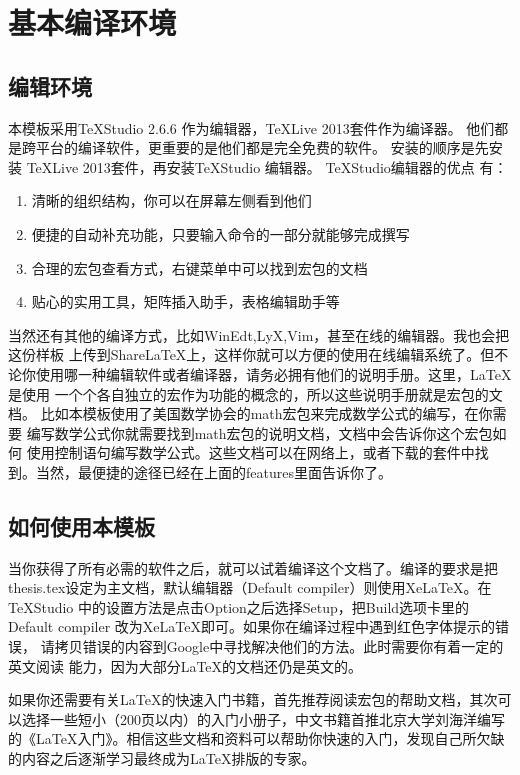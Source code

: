 \section{基本编译环境}
\subsection{编辑环境}

本模板采用\TeX Studio 2.6.6 作为编辑器，\TeX Live 2013套件作为编译器。
他们都是跨平台的编译软件，更重要的是他们都是完全免费的软件。 安装的顺序是先安装
\TeX Live 2013套件，再安装\TeX Studio 编辑器。 \TeX Studio编辑器的优点
有：
\begin{enumerate}
\item 清晰的组织结构，你可以在屏幕左侧看到他们
\item 便捷的自动补充功能，只要输入命令的一部分就能够完成撰写
\item 合理的宏包查看方式，右键菜单中可以找到宏包的文档
\item 贴心的实用工具，矩阵插入助手，表格编辑助手等
\end{enumerate}

当然还有其他的编译方式，比如WinEdt,LyX,Vim，甚至在线的编辑器。我也会把这份样板
上传到ShareLaTeX上，这样你就可以方便的使用在线编辑系统了。但不论你使用哪一种编辑软件或者编译器，请务必拥有他们的说明手册。这里，\LaTeX 是使用
一个个各自独立的宏作为功能的概念的，所以这些说明手册就是宏包的文档。
比如本模板使用了美国数学协会的\AmS math宏包来完成数学公式的编写，在你需要
编写数学公式你就需要找到\AmS math宏包的说明文档，文档中会告诉你这个宏包如何
使用控制语句编写数学公式。这些文档可以在网络上，或者下载的套件中找到。当然，最便捷的途径已经在上面的features里面告诉你了。
\subsection{如何使用本模板}
当你获得了所有必需的软件之后，就可以试着编译这个文档了。编译的要求是把thesis.tex设定为主文档，默认编辑器（Default compiler）则使用Xe\LaTeX 。在\TeX Studio 中的设置方法是点击Option之后选择Setup，把Build选项卡里的Default compiler 改为Xe\LaTeX 即可。如果你在编译过程中遇到红色字体提示的错误，
请拷贝错误的内容到Google中寻找解决他们的方法。此时需要你有着一定的英文阅读
能力，因为大部分\LaTeX 的文档还仍是英文的。

如果你还需要有关\LaTeX 的快速入门书籍，首先推荐阅读宏包的帮助文档，其次可以选择一些短小（200页以内）的入门小册子，中文书籍首推北京大学刘海洋编写的《\LaTeX 入门》。相信这些文档和资料可以帮助你快速的入门，发现自己所欠缺的内容之后逐渐学习最终成为\LaTeX 排版的专家。 